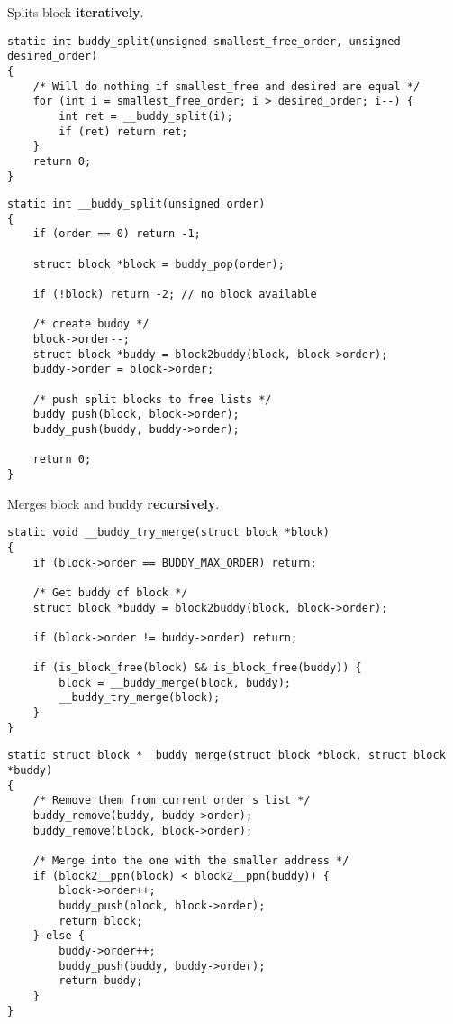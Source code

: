 Splits block \textbf{iteratively}.
\begin{lstlisting}[style=bright_C++]
static int buddy_split(unsigned smallest_free_order, unsigned desired_order)
{
	/* Will do nothing if smallest_free and desired are equal */
	for (int i = smallest_free_order; i > desired_order; i--) {
		int ret = __buddy_split(i);
		if (ret) return ret;
	}
	return 0;
}
\end{lstlisting}

\newpar{}
\begin{lstlisting}[style=bright_C++]
static int __buddy_split(unsigned order)
{
    if (order == 0) return -1;

    struct block *block = buddy_pop(order);

    if (!block) return -2; // no block available

    /* create buddy */
    block->order--;
    struct block *buddy = block2buddy(block, block->order);
    buddy->order = block->order;

    /* push split blocks to free lists */
    buddy_push(block, block->order);
    buddy_push(buddy, buddy->order);

    return 0;
}
\end{lstlisting}

\newpar{}

Merges block and buddy \textbf{recursively}.
\begin{lstlisting}[style=bright_C++]
static void __buddy_try_merge(struct block *block)
{
    if (block->order == BUDDY_MAX_ORDER) return;

    /* Get buddy of block */
    struct block *buddy = block2buddy(block, block->order);

    if (block->order != buddy->order) return;

    if (is_block_free(block) && is_block_free(buddy)) {
        block = __buddy_merge(block, buddy);
        __buddy_try_merge(block);
    }
}
\end{lstlisting}
\newpar{}
\begin{lstlisting}[style=bright_C++]
static struct block *__buddy_merge(struct block *block, struct block *buddy)
{
    /* Remove them from current order's list */
    buddy_remove(buddy, buddy->order);
    buddy_remove(block, block->order);

    /* Merge into the one with the smaller address */
    if (block2__ppn(block) < block2__ppn(buddy)) {
        block->order++;
        buddy_push(block, block->order);
        return block;
    } else {
        buddy->order++;
        buddy_push(buddy, buddy->order);
        return buddy;
    }
}
\end{lstlisting}

